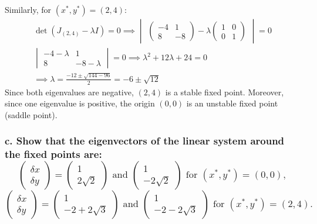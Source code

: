 \documentclass[12pt]{article}
\begin{document}
Similarly, for $(x^*,y^*) = (2,4)$:
\begin{align*}
    \det(J_{(2,4)} - \lambda I) = 0 \implies \begin{vmatrix}
                                                 \begin{pmatrix}
            -4 & 1  \\
            8  & -8
        \end{pmatrix} - \lambda \begin{pmatrix}
                                    1 & 0 \\
                                    0 & 1
                                \end{pmatrix}
                                             \end{vmatrix} = 0 \\
    \begin{vmatrix}
        -4-\lambda & 1          \\
        8          & -8-\lambda
    \end{vmatrix} = 0 \implies \lambda^2 + 12\lambda + 24 = 0                                               \\
    \implies \lambda = \frac{-12 \pm \sqrt{144-96}}{2} = -6 \pm \sqrt{12}
\end{align*}
Since both eigenvalues are negative, $(2,4)$ is a stable fixed point. Moreover, since one eigenvalue is positive, the origin $(0,0)$ is an unstable fixed point (saddle point).

\subsubsection*{c. Show that the eigenvectors of the linear system around the fixed points are:
    \[\begin{pmatrix} \delta x \\ \delta y \end{pmatrix} = \begin{pmatrix} 1 \\ 2\sqrt{2} \end{pmatrix} \text{ and } \begin{pmatrix} 1 \\ -2\sqrt{2} \end{pmatrix} \text{ for } (x^*,y^*) = (0,0),\]
    \[\begin{pmatrix} \delta x \\ \delta y \end{pmatrix} = \begin{pmatrix} 1 \\ -2 + 2\sqrt{3} \end{pmatrix} \text{ and } \begin{pmatrix} 1 \\ -2-2\sqrt{3} \end{pmatrix} \text{ for } (x^*,y^*) = (2,4).\]
}
\end{document}

